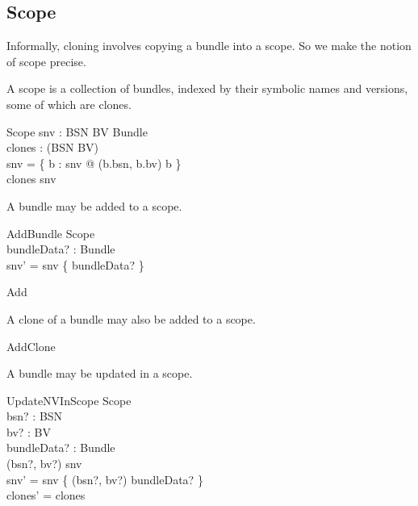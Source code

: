 \documentclass[a4paper,12pt]{article}
\begin{document}
\subsection{Scope}
Informally, cloning involves copying a bundle into a scope. So we make the notion of scope
precise.

A scope is a collection of bundles, indexed by their symbolic names and versions, some of which are clones.
\begin{schema}{Scope}
snv : BSN \cross BV \pinj Bundle \\
clones : \power (BSN \cross BV) \\
\where
snv = \{ b : \ran snv @ (b.bsn, b.bv) \mapsto b \} \\
clones \subseteq \dom snv \\
\end{schema}

A bundle may be added to a scope.
\begin{schema}{AddBundle}
\Delta Scope \\
bundleData? : Bundle \\
\where
\ran snv' = \ran snv \cup \{ bundleData? \} \\
\end{schema}

\begin{zed}
Add 
\end{zed}

A clone of a bundle may also be added to a scope.
\begin{zed}
AddClone 
\end{zed}

A bundle may be updated in a scope.
\begin{schema}{UpdateNVInScope}
\Delta Scope \\
bsn? : BSN \\
bv? : BV \\
bundleData? : Bundle \\
\where
(bsn?, bv?) \in \dom snv \\
snv' = snv \oplus \{ (bsn?, bv?) \mapsto bundleData? \} \\
clones' = clones \\
\end{schema}
\end{document}
